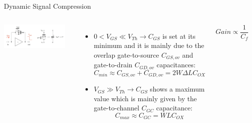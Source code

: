 \documentclass[aspectratio=169,xcolor=dvipsnames]{beamer}
\begin{document}
{\begin{frame}{Dynamic Signal Compression}
\begin{columns}
            \centering
            \includegraphics[width=0.9\textwidth]{images/backup_slides/dynamic_compression.pdf}

            \vspace{0.2cm}
            \begin{itemize}
                \item $0 < V_{GS} \ll V_{Th} \rightarrow C_{GS}$ is set at its minimum and it is mainly due to the overlap gate-to-source $C_{GS,ov}$ and gate-to-drain $C_{GD, ov}$ capacitances:
                \begin{equation*}
                    C_{min} \approx C_{GS,ov} + C_{GD,ov} = 2W\Delta L C_{OX}
                \end{equation*}
                \item $V_{GS} \gg V_{Th} \rightarrow C_{GS}$ shows a maximum value which is mainly given by the gate-to-channel $C_{GC}$ capacitance:
                \begin{equation*}
                    C_{max} \approx C_{GC} = WLC_{OX}
                \end{equation*}
            \end{itemize}

            \vspace{-0.25cm}
            \begin{equation*}
                Gain \propto \frac{1}{C_{f}}
            \end{equation*}
            
    \end{columns}
    
\end{frame}
}
\end{document}

